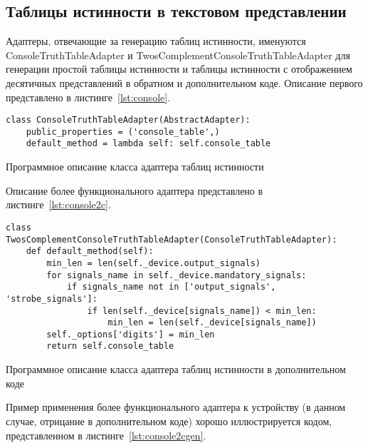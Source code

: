 \documentclass[document.tex]{subfiles}
\begin{document}
\clearpage
\subsection{Таблицы истинности в текстовом представлении}
Адаптеры, отвечающие за генерацию таблиц истинности, именуются
ConsoleTruthTableAdapter и TwosComplementConsoleTruthTableAdapter для
генерации простой таблицы истинности и таблицы истинности с отображением
десятичных представлений в обратном и дополнительном коде. Описание первого
представлено в листинге~\ref{lst:console}.

\begin{listing}[ht]
\begin{verbatim}
class ConsoleTruthTableAdapter(AbstractAdapter):
    public_properties = ('console_table',)
    default_method = lambda self: self.console_table
\end{verbatim}
\caption{Программное описание класса адаптера таблиц истинности}
\label{lst:console}
\end{listing}

Описание более функционального адаптера представлено в
листинге~\ref{lst:console2c}.

\begin{listing}[ht]
\begin{verbatim}
class TwosComplementConsoleTruthTableAdapter(ConsoleTruthTableAdapter):
    def default_method(self):
        min_len = len(self._device.output_signals)
        for signals_name in self._device.mandatory_signals:
            if signals_name not in ['output_signals', 'strobe_signals']:
                if len(self._device[signals_name]) < min_len:
                    min_len = len(self._device[signals_name])
        self._options['digits'] = min_len
        return self.console_table
\end{verbatim}
\caption{Программное описание класса адаптера таблиц истинности в
дополнительном коде}
\label{lst:console2c}
\end{listing}

\clearpage

Пример применения более функционального адаптера к устройству (в данном случае,
отрицание в дополнительном коде) хорошо иллюстрируется кодом, представленном в
листинге~\ref{lst:console2cgen}.
\end{document}
